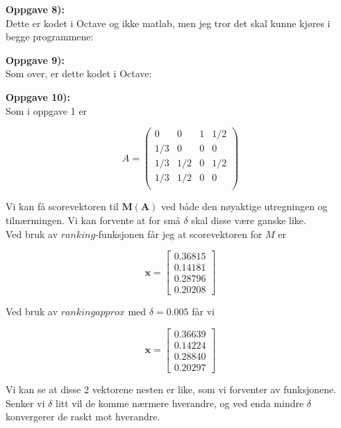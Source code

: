\documentclass[a4paper,norsk,11pt,twoside]{article}
\begin{document}
\newpage


\textbf{Oppgave 8):}\\

Dette er kodet i Octave og ikke matlab, men jeg tror det skal kunne kjøres i begge programmene: \\



\newpage


\textbf{Oppgave 9):}\\

Som over, er dette kodet i Octave:\\



\newpage

\textbf{Oppgave 10):}\\

Som i oppgave 1 er

$$
A = 
\begin{pmatrix}
0 & 0 & 1 & 1/2\\
1/3 & 0 & 0 & 0\\
1/3 & 1/2 & 0 & 1/2\\
1/3 & 1/2 & 0 & 0\\
\end{pmatrix}
$$


Vi kan få scorevektoren til $\textbf{M}(\textbf{A})$ ved både den nøyaktige utregningen og tilnærmingen. Vi kan forvente at for små $\delta$ skal disse være ganske like.\\

Ved bruk av $ranking$-funksjonen får jeg at scorevektoren for $M$ er

$$
\textbf{x} = \begin{bmatrix}
0.36815 \\ 0.14181 \\ 0.28796 \\ 0.20208 
\end{bmatrix}
$$

Ved bruk av $rankingapprox$ med $\delta = 0.005$ får vi

$$
\textbf{x} = \begin{bmatrix}
0.36639 \\ 0.14224 \\ 0.28840 \\ 0.20297
\end{bmatrix}
$$

Vi kan se at disse 2 vektorene nesten er like, som vi forventer av funksjonene. Senker vi $\delta$ litt vil de komme nærmere hverandre, og ved enda mindre $\delta$ konvergerer de raskt mot hverandre.
\end{document}
